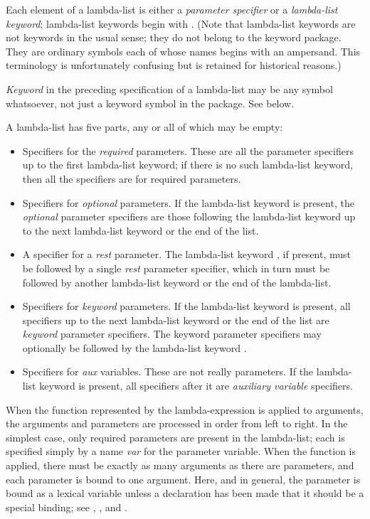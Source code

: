 Each element of a lambda-list is either a \emph{parameter specifier}
or a \emph{lambda-list keyword}; lambda-list keywords begin with \cd{\&}.
(Note that lambda-list keywords are not keywords in the usual sense;
they do not belong to the keyword package.  They are ordinary symbols
each of whose names begins with an ampersand.  This terminology
is unfortunately confusing but is retained for historical reasons.)

\emph{Keyword} in the preceding specification of a lambda-list
may be any symbol whatsoever, not just a keyword symbol
in the  package.  See below.

A lambda-list has five parts, any or all of which may be empty:

\begin{itemize}
\item
Specifiers for the \emph{required} parameters.  These are all the parameter
specifiers up to the first lambda-list keyword; if there is no such
lambda-list keyword, then all the specifiers are for required parameters.

\item
Specifiers for \emph{optional} parameters.
If the lambda-list keyword  is present,
the \emph{optional} parameter specifiers are those following the
lambda-list keyword  up to the next lambda-list keyword or the
end of the list.

\item
A specifier for a \emph{rest} parameter.  The lambda-list keyword , if present, must
be followed by a single \emph{rest} parameter specifier,
which in turn must be followed by another lambda-list keyword or the end
of the lambda-list.

\item
Specifiers for \emph{keyword} parameters.
If the lambda-list keyword  is present, all specifiers up to the next lambda-list keyword
or the end of the list are \emph{keyword} parameter specifiers.
The keyword parameter specifiers may optionally be followed by the
lambda-list keyword .

\item
Specifiers for \emph{aux} variables.  These are not really parameters.
If the lambda-list keyword  is present, all specifiers after it are
\emph{auxiliary variable} specifiers.
\end{itemize}

When the function represented by the lambda-expression is applied
to arguments, the arguments and parameters are processed in order
from left to right.
In the simplest case, only required parameters are present
in the lambda-list; each is specified simply by a name \emph{var} for
the parameter variable.
When the function is applied,
there must be exactly as many arguments as there are parameters,
and each parameter is bound to one argument.  Here, and in general,
the parameter is bound as a lexical variable unless a
declaration has been made that it should be a special binding;
see , , and .

